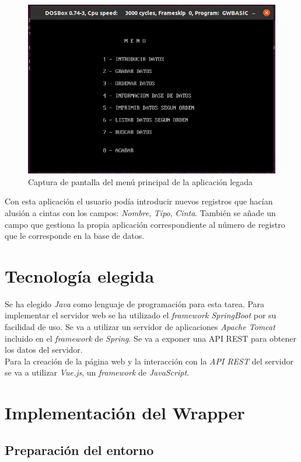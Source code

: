 \documentclass[10pt,a4paper]{article}
\begin{document}
\begin{figure}[h!]
\centering
\includegraphics[scale=0.5]{images/aplicacion_legada.png}
\caption{Captura de pantalla del menú principal de la aplicación legada}
\label{fig:aplicacion_legada}
\end{figure}

Con esta aplicación el usuario podía introducir nuevos registros que hacían alusión a cintas con los campos: \emph{Nombre}, \emph{Tipo}, \emph{Cinta}. También se añade un campo que gestiona la propia aplicación correspondiente al número de registro que le corresponde en la base de datos.


\section{Tecnología elegida}

Se ha elegido \emph{Java} como lenguaje de programación para esta tarea. Para implementar el servidor web se ha utilizado el \emph{framework SpringBoot} por su facilidad de uso. Se va a utilizar un servidor de aplicaciones \emph{Apache Tomcat} incluido en el \emph{framework} de \emph{Spring}. Se va a exponer una API REST para obtener los datos del servidor.\\
Para la creación de la página web y la interacción con la \emph{API REST} del servidor se va a utilizar \emph{Vue.js}, un \emph{framework} de \emph{JavaScript}.\\

\section{Implementación del Wrapper}
\subsection{Preparación del entorno}
\end{document}
